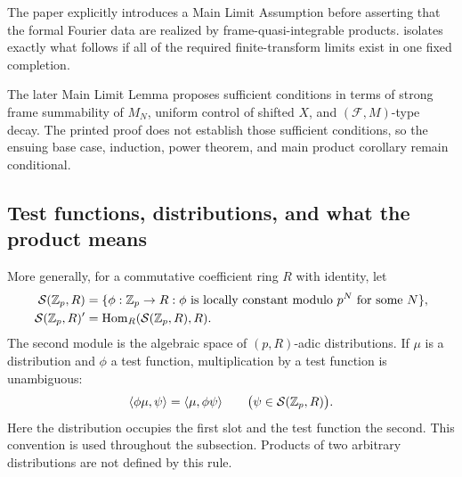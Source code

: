 \begin{status}
The paper explicitly introduces a Main Limit Assumption before asserting
that the formal Fourier data are realized by frame-quasi-integrable products.
 isolates exactly what follows if all of
the required finite-transform limits exist in one fixed completion.

The later Main Limit Lemma proposes sufficient conditions in terms of strong
frame summability of $M_N$, uniform control of shifted $X$, and
$(\mathcal F,M)$-type decay.  The printed proof does not establish those
sufficient conditions, so the ensuing base case, induction, power theorem,
and main product corollary remain conditional.
\end{status}

\subsection{Test functions, distributions, and what the product means}

More generally, for a commutative coefficient ring $R$ with identity, let
\begin{align}
 \mathcal S(\mathbb Z_p,R)
 &=\{\phi:\mathbb Z_p\to R:\phi\text{ is locally constant modulo }p^N
       \text{ for some }N\},\\
 \mathcal S(\mathbb Z_p,R)'&=\operatorname{Hom}_R(\mathcal S(\mathbb Z_p,R),R).
\end{align}
The second module is the algebraic space of $(p,R)$-adic distributions.  If
$\mu$ is a distribution and $\phi$ a test function, multiplication by a test
function is unambiguous:
\[
 \langle\phi\mu,\psi\rangle
 =\langle\mu,\phi\psi\rangle
 \qquad\bigl(\psi\in\mathcal S(\mathbb Z_p,R)\bigr).
\]
Here the distribution occupies the first slot and the test function the
second.  This convention is used throughout the subsection.
Products of two arbitrary distributions are not defined by this rule.

